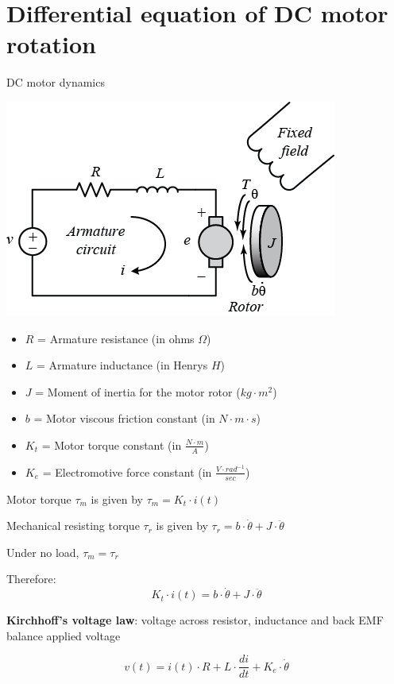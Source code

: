 \documentclass[compress]{beamer}
\begin{document}
\section{Differential equation of DC motor rotation}

\begin{frame}{DC motor dynamics}

    \begin{center}
        \includegraphics[width=0.5\linewidth]{image63}
    \end{center}

 {
\begin{itemize}

\item $R$ = Armature resistance (in ohms $\Omega$)
\item $L$ = Armature inductance (in Henrys $H$) %
\item $J$ = Moment of inertia for the motor rotor ($kg\cdot m^2$)
\item $b$ = Motor viscous friction constant (in $N\cdot m\cdot s$)
\item $K_t$ = Motor torque constant (in $\frac{N\cdot m}{A}$)
\item $K_e$ = Electromotive force constant (in $\frac{V\cdot rad^{-1}}{sec}$) %
\end{itemize}
}

     {
    Motor torque $\tau_m$ is given by $\tau_m = K_t \cdot i(t)$

Mechanical resisting torque $\tau_r$ is given by $\tau_r = b \cdot \dot\theta + J \cdot \ddot\theta$

Under no load, $\tau_m = \tau_r$

Therefore:
\[
    K_t \cdot i(t) = b \cdot \dot\theta + J \cdot \ddot\theta
\]

}
     {

\textbf{Kirchhoff's voltage law}: voltage across resistor, inductance and
back EMF balance applied voltage

    \[
        v(t) = i(t) \cdot R + L \cdot \frac{di}{dt} + K_e \cdot \dot\theta
    \]
}
\end{frame}
\end{document}

